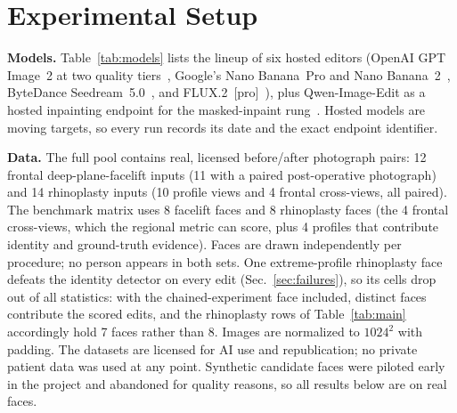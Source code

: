 \section{Experimental Setup}
\label{sec:setup}

\begin{table}[t]
  \centering
  \caption{Models in the study. All run behind fal.ai endpoints; cost is the
  provider's per-image estimate at the pinned date.}
  \label{tab:models}
  \resizebox{\columnwidth}{!}{}
\end{table}

\textbf{Models.} Table~\ref{tab:models} lists the lineup of six hosted editors
(OpenAI GPT Image~2 at two quality tiers~\cite{openai2026gptimage2}, Google's
Nano Banana~Pro and Nano
Banana~2~\cite{google2025nanobananapro,google2025nanobanana}, ByteDance
Seedream~5.0~\cite{seedream5_2026,seedream4_2025}, and
FLUX.2~[pro]~\cite{bfl2025flux2,bfl2025fluxkontext}), plus Qwen-Image-Edit as a hosted
inpainting endpoint for the masked-inpaint rung~\cite{wu2025qwenimage}. Hosted
models are moving targets, so every run records its date and the exact endpoint
identifier.

\textbf{Data.} The full pool contains real, licensed before/after photograph
pairs: 12 frontal deep-plane-facelift inputs (11 with a paired post-operative
photograph) and 14 rhinoplasty inputs (10 profile views and 4 frontal
cross-views, all paired). The benchmark matrix uses 8 facelift faces and 8
rhinoplasty faces (the 4 frontal cross-views, which the regional metric can
score, plus 4 profiles that contribute identity and ground-truth evidence).
Faces are drawn independently per procedure; no person appears in both sets.
One extreme-profile rhinoplasty face defeats the identity detector on every
edit (Sec.~\ref{sec:failures}), so its cells drop out of all statistics:
with the chained-experiment face included, \NumFacesScored{} distinct faces
contribute the scored edits, and the rhinoplasty rows of
Table~\ref{tab:main} accordingly hold 7 faces rather than 8.
Images are normalized to $1024^2$ with padding. The datasets are licensed for AI
use and republication; no private patient data was used at any point. Synthetic
candidate faces were piloted early in the project and abandoned for quality
reasons, so all results below are on real faces.

